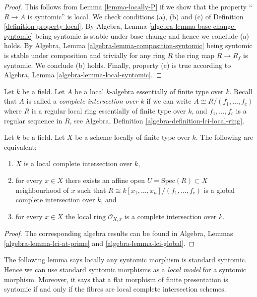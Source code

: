 \begin{proof}
This follows from Lemma \ref{lemma-locally-P} if we show that
the property ``$R \to A$ is syntomic'' is local.
We check conditions (a), (b) and (c) of Definition
\ref{definition-property-local}.
By Algebra, Lemma \ref{algebra-lemma-base-change-syntomic}
being syntomic is stable under base change and hence
we conclude (a) holds. By
Algebra, Lemma \ref{algebra-lemma-composition-syntomic}
being syntomic is stable under composition and trivially for any ring
$R$ the ring map $R \to R_f$ is syntomic.
We conclude (b) holds. Finally, property (c) is true
according to Algebra, Lemma \ref{algebra-lemma-local-syntomic}.
\end{proof}

\noindent
Let $k$ be a field. Let $A$ be a local $k$-algebra essentially
of finite type over $k$. Recall that $A$ is called a
{\it complete intersection over $k$} if we can write
$A \cong R/(f_1, \ldots, f_c)$ where $R$ is a regular local ring
essentially of finite type over $k$, and $f_1, \ldots, f_c$ is
a regular sequence in $R$, see
Algebra, Definition \ref{algebra-definition-lci-local-ring}.

\begin{lemma}
\label{lemma-local-complete-intersection}
Let $k$ be a field.
Let $X$ be a scheme locally of finite type over $k$.
The following are equivalent:
\begin{enumerate}
\item $X$ is a local complete intersection over $k$,
\item for every $x \in X$ there exists an affine open
$U = \text{Spec}(R) \subset X$ neighbourhood of $x$
such that $R \cong k[x_1, \ldots, x_n]/(f_1, \ldots, f_c)$
is a global complete intersection over $k$, and
\item for every $x \in X$ the local ring $\mathcal{O}_{X, x}$
is a complete intersection over $k$.
\end{enumerate}
\end{lemma}

\begin{proof}
The corresponding algebra results can be found in
Algebra, Lemmas \ref{algebra-lemma-lci-at-prime} and
\ref{algebra-lemma-lci-global}.
\end{proof}

\noindent
The following lemma says locally any syntomic morphism is standard syntomic.
Hence we can use standard syntomic morphisms as a {\it local model}
for a syntomic morphism. Moreover, it says that a flat morphism of finite
presentation is syntomic if and only if the fibres are local complete
intersection schemes.


